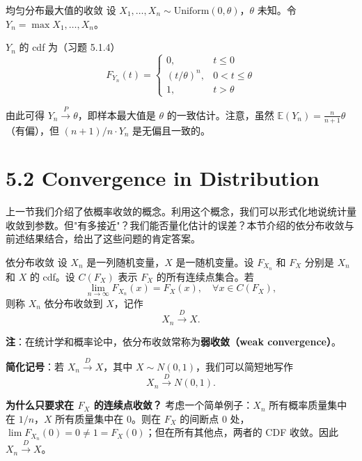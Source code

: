 \begin{example}{均匀分布最大值的收敛}\label{ex:uniform-max-convergence}
设 $X_1, \ldots, X_n \sim \mathrm{Uniform}(0, \theta)$，$\theta$ 未知。令 $Y_n = \max{X_1, \ldots, X_n}$。

$Y_n$ 的 cdf 为（习题 5.1.4）
\[
F_{Y_n}(t) = \begin{cases}
0, & t \leq 0 \\
(t/\theta)^n, & 0 < t \leq \theta \\
1, & t > \theta
\end{cases}
\label{eq:uniform-max-cdf}
\]

由此可得 $Y_n \xrightarrow{P} \theta$，即样本最大值是 $\theta$ 的一致估计。注意，虽然 $\mathbb{E}(Y_n) = \frac{n}{n+1}\theta$（有偏），但 $(n+1)/n \cdot Y_n$ 是无偏且一致的。%
\end{example}

\section{5.2 Convergence in Distribution}\label{sec:5.2}

上一节我们介绍了依概率收敛的概念。利用这个概念，我们可以形式化地说统计量收敛到参数。但"有多接近"？我们能否量化估计的误差？本节介绍的依分布收敛与前述结果结合，给出了这些问题的肯定答案。

\begin{definition}{依分布收敛}\label{def:convergence-in-distribution}
设 ${X_n}$ 是一列随机变量，$X$ 是一随机变量。设 $F_{X_n}$ 和 $F_X$ 分别是 $X_n$ 和 $X$ 的 cdf。设 $C(F_X)$ 表示 $F_X$ 的所有连续点集合。若
\[
\lim_{n \to \infty} F_{X_n}(x) = F_X(x),\quad \forall x \in C(F_X),
\]
则称 $X_n$ 依分布收敛到 $X$，记作
\[
X_n \xrightarrow{D} X.
\]
\end{definition}

\textbf{注}：在统计学和概率论中，依分布收敛常称为\textbf{弱收敛（weak convergence）}。

\textbf{简化记号}：若 $X_n \xrightarrow{D} X$，其中 $X \sim N(0,1)$，我们可以简短地写作
\[
X_n \xrightarrow{D} N(0,1).
\label{eq:normal-convergence-notation}
\]

\textbf{为什么只要求在 $F_X$ 的连续点收敛？} 考虑一个简单例子：$X_n$ 所有概率质量集中在 $1/n$，$X$ 所有质量集中在 $0$。则在 $F_X$ 的间断点 $0$ 处，$\lim F_{X_n}(0) = 0 \neq 1 = F_X(0)$；但在所有其他点，两者的 CDF 收敛。因此 $X_n \xrightarrow{D} X$。

